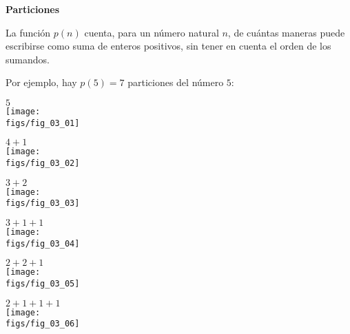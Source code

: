 \documentclass{article}
\newcommand\figs{./figs}
\begin{document}
\shorthandoff{>}\shorthandoff{<}
\centerline{\large\bf Particiones}
\vspace{5mm}

La función $p(n)$ cuenta,
para un número natural $n$, de cuántas maneras puede
escribirse como suma de enteros positivos, sin tener en
cuenta el orden de los sumandos.

Por ejemplo, hay $p(5) = 7$ particiones del número $5$:

\begin{minipage}[t]{.13\linewidth}
\begin{center}
{\footnotesize $5$}\\[3mm]

\texttt{[image: \\figs/fig\_03\_01]}
\end{center}
\end{minipage}\hfill
\begin{minipage}[t]{.13\linewidth}
\begin{center}
{\footnotesize $4 + 1$}\\[3mm]

\texttt{[image: \\figs/fig\_03\_02]}
\end{center}
\end{minipage}\hfill
\begin{minipage}[t]{.13\linewidth}
\begin{center}
{\footnotesize $3 + 2$}\\[3mm]

\texttt{[image: \\figs/fig\_03\_03]}
\end{center}
\end{minipage}\hfill
\begin{minipage}[t]{.13\linewidth}
\begin{center}
{\footnotesize $3 + 1 + 1$}\\[3mm]

\texttt{[image: \\figs/fig\_03\_04]}
\end{center}
\end{minipage}\hfill
\begin{minipage}[t]{.13\linewidth}
\begin{center}
{\footnotesize $2 + 2 + 1$}\\[3mm]

\texttt{[image: \\figs/fig\_03\_05]}
\end{center}
\end{minipage}\hfill
\begin{minipage}[t]{.13\linewidth}
\begin{center}
{\footnotesize $2 + 1 + 1 + 1$}\\[3mm]

\texttt{[image: \\figs/fig\_03\_06]}
\end{center}
\end{minipage}\hfill
\end{document}
